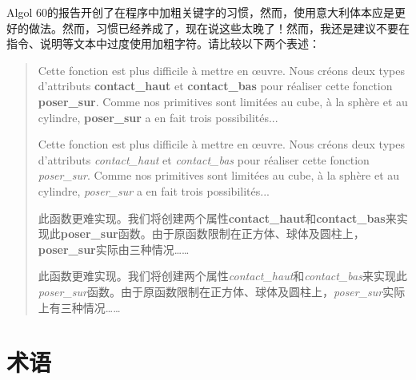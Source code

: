 Algol 60的报告开创了在程序中加粗关键字的习惯，然而，使用意大利体本应是更好的做法。然而，习惯已经养成了，现在说这些太晚了！然而，我还是建议不要在指令、说明等文本中过度使用加粗字符。请比较以下两个表述：

\begin{quote}
    Cette fonction est plus difficile à mettre en œuvre. Nous créons deux types d'attributs \textbf{contact\_haut} et \textbf{contact\_bas} pour réaliser cette fonction \textbf{poser\_sur}. Comme nos primitives sont limitées au cube, à la sphère et au cylindre, \textbf{poser\_sur} a en fait trois possibilités...

    Cette fonction est plus difficile à mettre en œuvre. Nous créons deux types d'attributs \emph{contact\_haut} et \emph{contact\_bas} pour réaliser cette fonction \emph{poser\_sur}. Comme nos primitives sont limitées au cube, à la sphère et au cylindre, \emph{poser\_sur} a en fait trois possibilités...

    \begin{bil}
        此函数更难实现。我们将创建两个属性\textbf{contact\_haut}和\textbf{contact\_bas}来实现此\textbf{poser\_\linebreak sur}函数。由于原函数限制在正方体、球体及圆柱上，\textbf{poser\_sur}实际由三种情况……

        此函数更难实现。我们将创建两个属性\emph{contact\_haut}和\emph{contact\_bas}来实现此\emph{poser\_sur}函数。由于原函数限制在正方体、球体及圆柱上，\emph{poser\_sur}实际上有三种情况……
    \end{bil}
\end{quote}

\section{术语}

